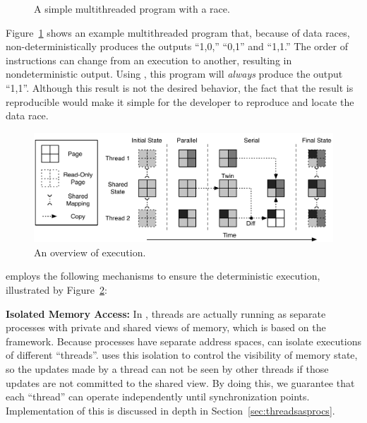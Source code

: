 \begin{figure}[!ht]
\fbox{
\subfigure{}
\\
\hspace{10pt}
\subfigure{}
\hspace{10pt}
\subfigure{}
}
\caption{A simple multithreaded program with a race.\label{fig:sample}}
\end{figure}

Figure~\ref{fig:sample} shows an example multithreaded program that, because of data races, non-deterministically produces the outputs ``1,0,'' ``0,1'' and ``1,1.''  The order of instructions can change from an execution to another, resulting in nondeterministic output. Using \dthreads{}, this program will \emph{always} produce the output ``1,1''. Although this result is not the desired behavior, the fact that the result is reproducible would make it simple for the developer to reproduce and locate the data race.

\begin{figure}[h]
{\centering
\includegraphics{dthreads/figure/architecture-diagram}
\caption{An overview of \dthreads{} execution.\label{fig:architecture}}
}
\end{figure}

\dthreads{} employs the following mechanisms to ensure the deterministic execution, illustrated by Figure~\ref{fig:architecture}: 

\textbf{Isolated Memory Access:} In \dthreads{}, threads are actually running as separate processes with private and shared views of memory, which is based on the \sheriff{} framework. Because processes have separate address spaces, \dthreads{} can isolate executions of different ``threads''. \dthreads{} uses this isolation to control the visibility of memory state, so the updates made by a thread can not be seen by other threads if those updates are not committed to the shared view. By doing this, we guarantee that each ``thread'' can operate independently until synchronization points. Implementation of this is discussed in depth in Section~\ref{sec:threadsasprocs}.

